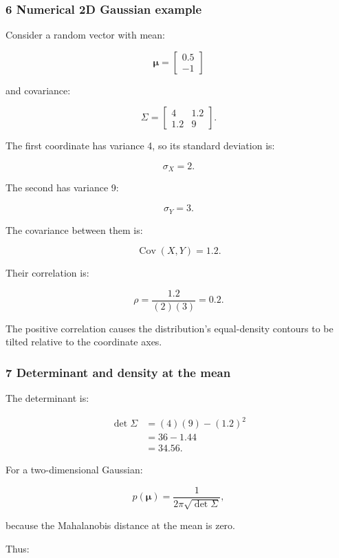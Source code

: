 \subsubsection{6 Numerical 2D Gaussian example}\label{02-foundations-ii-ch024-numerical-2d-gaussian-example}

Consider a random vector with mean:

\[
 \boldsymbol\mu= \begin{bmatrix} 0.5\\-1 \end{bmatrix}
\]

and covariance:

\[
 \boxed{ \Sigma= \begin{bmatrix} 4&1.2\\ 1.2&9 \end{bmatrix} }.
\]

The first coordinate has variance 4, so its standard deviation is:

\[
 \sigma_X=2.
\]

The second has variance 9:

\[
 \sigma_Y=3.
\]

The covariance between them is:

\[
 \operatorname{Cov}(X,Y)=1.2.
\]

Their correlation is:

\[
 \rho=\frac{1.2}{(2)(3)} =\boxed{0.2}.
\]

The positive correlation causes the distribution's equal-density contours to be tilted relative to the coordinate axes.

\subsubsection{7 Determinant and density at the mean}\label{02-foundations-ii-ch024-determinant-and-density-at-the-mean}

The determinant is:

\[
 \begin{aligned} \det\Sigma &=(4)(9)-(1.2)^2\\ &=36-1.44\\ &=\boxed{34.56}. \end{aligned}
\]

For a two-dimensional Gaussian:

\[
 p(\boldsymbol\mu)= \frac1{2\pi\sqrt{\det\Sigma}},
\]

because the Mahalanobis distance at the mean is zero.

Thus:

